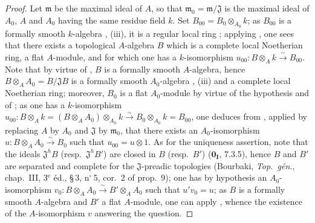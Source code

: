 \begin{proof}
Let $\mathfrak{m}$ be the maximal ideal of $A$, so that $\mathfrak{m}_0=\mathfrak{m}/\mathfrak{J}$ is the maximal ideal of $A_0$, $A$ and $A_0$ having the same residue field $k$.
Set $B_{00}=B_0\otimes_{A_0} k$; as $B_{00}$ is a formally smooth $k$-algebra , (iii), it is a regular local ring ; applying , one sees that there exists a topological $A$-algebra $B$ which is a complete local Noetherian ring, a flat $A$-module, and for which one has a $k$-isomorphism $u_{00}:B\otimes_A k\xrightarrow{\sim} B_{00}$.
Note that by virtue of , $B$ is a formally smooth $A$-algebra, hence $B\otimes_A A_0=B/\mathfrak{J}B$ is a formally smooth $A_0$-algebra , (iii) and a complete local Noetherian ring; moreover, $B_0$ is a flat $A_0$-module by virtue of the hypothesis and of ; as one has a $k$-isomorphism $u_{00}:B\otimes_A k=(B\otimes_A A_0)\otimes_{A_0} k\xrightarrow{\sim} B_0\otimes_{A_0} k = B_{00}$, one deduces from , applied by replacing $A$ by $A_0$ and $\mathfrak{J}$ by $\mathfrak{m}_0$, that there exists an $A_0$-isomorphism $u:B\otimes_A A_0\xrightarrow{\sim} B_0$ such that $u_{00}=u\otimes 1$.
As for the uniqueness assertion, note that the ideals $\mathfrak{J}^h B$ (resp.\ $\mathfrak{J}^h B'$) are closed in $B$ (resp.\ $B'$) ($\mathbf{0_I}$, 7.3.5), hence $B$ and $B'$ are separated and complete for the $\mathfrak{J}$-preadic topologies (Bourbaki, \emph{Top.\ g\'{e}n.}, chap.~III, 3$^\text{e}$ \'{e}d., \S\,3, n$^\circ$\,5, cor.~2 of prop.~9); one has by hypothesis an $A_0$-isomorphism $v_0:B\otimes_A A_0\xrightarrow{\sim} B'\otimes_A A_0$ such that $u'v_0=u$; as $B$ is a formally smooth $A$-algebra and $B'$ a flat $A$-module, one can apply , whence the existence of the $A$-isomorphism $v$ answering the question.
\end{proof}

